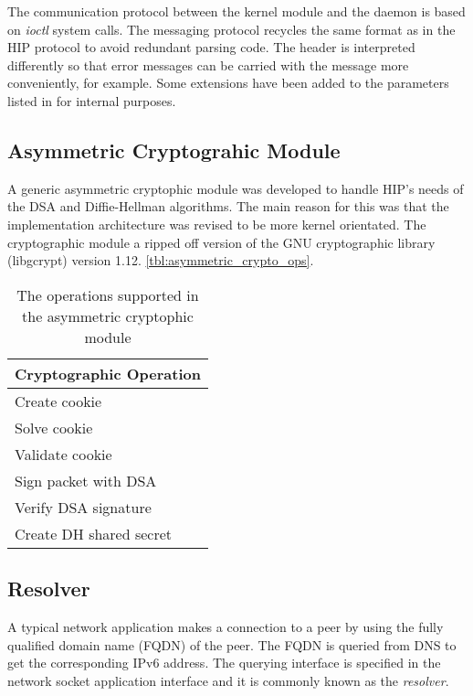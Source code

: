 The communication protocol between the kernel module and the daemon is
based on \textit{ioctl} system calls. The messaging protocol recycles
the same format as in the HIP protocol \cite{hip} to avoid redundant
parsing code. The header is interpreted differently so that error
messages can be carried with the message more conveniently, for
example. Some extensions have been added to the parameters listed in
\cite{hip} for internal purposes.

\subsection{Asymmetric Cryptograhic Module}

A generic asymmetric cryptophic module was developed to handle HIP's needs
of the DSA and Diffie-Hellman algorithms. The main reason for this
was that the implementation architecture was revised to be more kernel
orientated. The cryptographic module a ripped off version of the GNU cryptographic
library (libgcrypt) version 1.12. 
\autoref{tbl:asymmetric_crypto_ops}.

\begin{table}[htb]
\centering
\begin{tabular}{|l|}\hline
Cryptographic Operation \\\hline
Create cookie  \\
Solve cookie \\
Validate cookie \\
Sign packet with DSA \\
Verify DSA signature \\
Create DH shared secret \\
\hline
\end{tabular}
\caption{The operations supported in the asymmetric cryptophic module}
\label{tbl:asymmetric_crypto_ops}
\end{table}

\subsection{Resolver}
\label{sec:resolver_architecture}

A typical network application makes a connection to a peer by using
the fully qualified domain name (FQDN) of the peer. The FQDN is
queried from DNS to get the corresponding IPv6 address. The querying
interface is specified in the network socket application interface and
it is commonly known as the \textit{resolver}.

